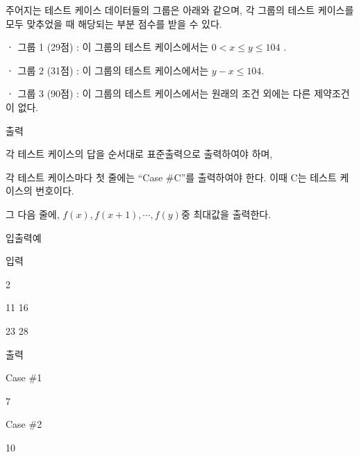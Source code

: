 \documentclass [12pt] {oblivoir}
\begin{document}
주어지는 테스트 케이스 데이터들의 그룹은 아래와 같으며,
각 그룹의 테스트 케이스를 모두 맞추었을 때 해당되는 부분 점수를 받을 수 있다.

ㆍ 그룹 1 (29점) : 이 그룹의 테스트 케이스에서는 $0 < x \le y \le 104$ .

ㆍ 그룹 2 (31점) : 이 그룹의 테스트 케이스에서는 $ y - x \le 104$.

ㆍ 그룹 3 (90점) : 이 그룹의 테스트 케이스에서는 원래의 조건 외에는 다른 제약조건이 없다.

출력

각 테스트 케이스의 답을 순서대로 표준출력으로 출력하여야 하며,

각 테스트 케이스마다 첫 줄에는 “Case \#C”를 출력하여야 한다. 이때 C는 테스트 케이스의 번호이다.

그 다음 줄에, $f(x), f(x+1) , \cdots , f(y)$중 최대값을 출력한다.

입출력예

입력

2

11 16

23 28

출력

Case \#1

7

Case \#2

10
\end{document}
